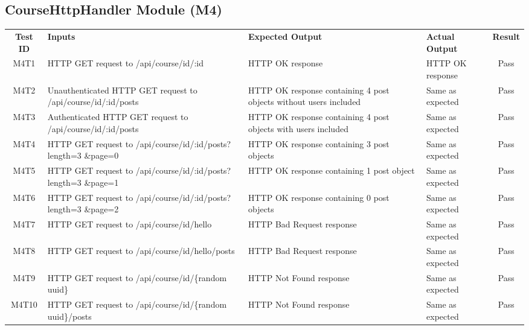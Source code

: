 \documentclass[fullpage]{article}
\begin{document}
\subsection{CourseHttpHandler Module (M4)}
\begin{table}[H]
\flushleft
\begin{tabular}{|c|p{4.5cm}|p{3.6cm}|p{3.6cm}|c|}
\hline
 \rowcolor{lightgray}
\textbf{Test ID} &\textbf{Inputs} &\textbf{Expected Output} &\textbf{Actual Output} &\textbf{Result}\\
M4T1 & HTTP GET request to /api/course/id/:id & HTTP OK response & HTTP OK response & Pass \\
\hline
M4T2 & Unauthenticated HTTP GET request to /api/course/id/:id/posts & HTTP OK response containing 4 post objects without users included & Same as expected & Pass\\
\hline
M4T3 & Authenticated HTTP GET request to /api/course/id/:id/posts & HTTP OK response containing 4 post objects with users included & Same as expected & Pass\\
\hline
M4T4 & HTTP GET request to /api/course/id/:id/posts?length=3 \&page=0 & HTTP OK response containing 3 post objects & Same as expected & Pass\\
\hline
M4T5 & HTTP GET request to /api/course/id/:id/posts?length=3 \&page=1 & HTTP OK response containing 1 post object & Same as expected & Pass\\
\hline
M4T6 & HTTP GET request to /api/course/id/:id/posts?length=3 \&page=2 & HTTP OK response containing 0 post objects & Same as expected & Pass\\
\hline
M4T7 & HTTP GET request to /api/course/id/hello & HTTP Bad Request response  & Same as expected & Pass\\
\hline
M4T8 & HTTP GET request to /api/course/id/hello/posts & HTTP Bad Request response  & Same as expected& Pass\\
\hline
M4T9 & HTTP GET request to /api/course/id/\{random uuid\} & HTTP Not Found response  & Same as expected & Pass\\
\hline
M4T10 & HTTP GET request to /api/course/id/\{random uuid\}/posts & HTTP Not Found response  & Same as expected & Pass\\
\hline


\end{tabular}
\end{table}
\end{document}
